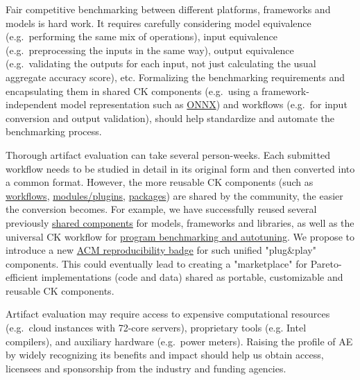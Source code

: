 \documentclass[10pt,onecolumn]{article}
\newenvironment{packed_itemize}{
\begin{itemize}
  \setlength{\itemsep}{1pt}
  \setlength{\parskip}{0pt}
  \setlength{\parsep}{0pt}
}{\end{itemize}}
\begin{document}
\begin{packed_itemize}

 \item

Fair competitive benchmarking between different platforms,
frameworks and models is hard work. It requires carefully
considering model equivalence (e.g.\ performing the same mix of
operations), input equivalence (e.g.\  preprocessing the inputs
in the same way), output equivalence (e.g.\ validating the
outputs for each input, not just calculating the usual
aggregate accuracy score), etc. Formalizing the benchmarking
requirements and encapsulating them in shared CK components
(e.g.\ using a framework-independent model representation such
as \href{https://onnx.ai/}{ONNX}) and workflows (e.g.\ for input conversion and output
validation), should help standardize and automate the
benchmarking process.

 \item

Thorough artifact evaluation can take several person-weeks.
Each submitted workflow needs to be studied in detail in its
original form and then converted into a common format.
However, the more reusable CK components (such as 
\href{http://cKnowledge.org/shared-programs.html}{workflows},
\href{http://cKnowledge.org/shared-modules.html}{modules/plugins}, 
\href{http://cKnowledge.org/shared-packages.html}{packages}) 
are shared by the community, the easier the conversion becomes. 
For example, we have
successfully reused several previously 
\href{https://github.com/ctuning/ck/wiki#user-content-reusable-ck-components}{shared components} 
for models, frameworks and libraries, as well as the universal
CK workflow for \href{http://cKnowledge.org/rpi-crowd-tuning}{program benchmarking and autotuning}.
We propose to introduce a new 
\href{https://www.acm.org/publications/policies/artifact-review-badging}{ACM reproducibility badge} 
for such unified "plug\&play" components. This could eventually
lead to creating a "marketplace" for Pareto-efficient
implementations (code and data) shared as portable,
customizable and reusable CK components.


 \item

Artifact evaluation may require access to expensive
computational resources (e.g.\ cloud instances with 72-core
servers), proprietary tools (e.g. Intel compilers), and
auxiliary hardware (e.g.\ power meters). Raising the profile
of AE by widely recognizing its benefits and impact should
help us obtain access, licensees and sponsorship from the
industry and funding agencies.


\end{packed_itemize}
\end{document}
